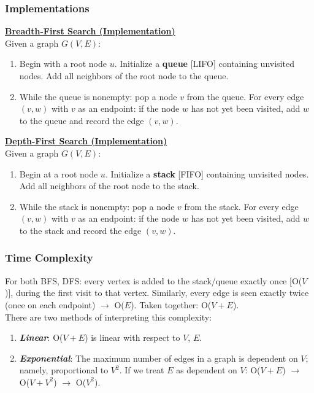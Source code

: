 \documentclass[12pt]{extarticle}
\theoremstyle{definition}
\theoremstyle{remark}
\begin{document}
\subsubsection*{Implementations}
\begin{tcolorbox}[colback=green!8!white]
\textbf{\ul{Breadth-First Search (Implementation)}}
\\[-9pt]

Given a graph $G(V,E)$:
\begin{enumerate}
    \item Begin with a root node $u$. Initialize a \textbf{queue} [LIFO] containing unvisited nodes. Add all neighbors of the root node to the queue.
    \item While the queue is nonempty: pop a node $v$ from the queue. For every edge $(v,w)$ with $v$ as an endpoint: if the node $w$ has not yet been visited, add $w$ to the queue and record the edge $(v,w)$.
\end{enumerate}
\end{tcolorbox}

\begin{tcolorbox}[colback=blue!8!white]
\textbf{\ul{Depth-First Search (Implementation)}}
\\[-9pt]

Given a graph $G(V,E)$:
\begin{enumerate}
    \item Begin at a root node $u$. Initialize a \textbf{stack} [FIFO] containing unvisited nodes. Add all neighbors of the root node to the stack.
    \item While the stack is nonempty: pop a node $v$ from the stack. For every edge $(v,w)$ with $v$ as an endpoint: if the node $w$ has not yet been visited, add $w$ to the stack and record the edge $(v,w)$.
\end{enumerate}
\end{tcolorbox}

\subsubsection*{Time Complexity}
For both BFS, DFS: every vertex is added to the stack/queue exactly once [O($V$)], during the first visit to that vertex. Similarly, every edge is seen exactly twice (once on each endpoint) $\rightarrow$ O($E$). Taken together: O($V+E$).\\

\noindent There are two methods of interpreting this complexity:
\begin{enumerate}
    \item \textbf{\textit{Linear}}: O($V+E$) is linear with respect to $V$, $E$.
    \item \textbf{\textit{Exponential}}: The maximum number of edges in a graph is dependent on $V$; namely, proportional to $V^2$. If we treat $E$ as dependent on $V$: O($V+E$) $\rightarrow$ O($V+V^2$) $\rightarrow$ O($V^2$).
\end{enumerate}
\end{document}
